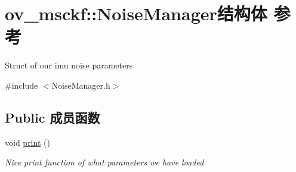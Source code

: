\hypertarget{structov__msckf_1_1NoiseManager}{}\section{ov\+\_\+msckf\+:\+:Noise\+Manager结构体 参考}
\label{structov__msckf_1_1NoiseManager}


Struct of our imu noise parameters  




{\ttfamily \#include $<$Noise\+Manager.\+h$>$}

\subsection*{Public 成员函数}
\begin{DoxyCompactItemize}
\item 
\mbox{\label{structov__msckf_1_1NoiseManager_a22f023f5dccac5c08d2785e33ec0eeee}} 
void \hyperlink{structov__msckf_1_1NoiseManager_a22f023f5dccac5c08d2785e33ec0eeee}{print} ()
\begin{DoxyCompactList}\small\item\em Nice print function of what parameters we have loaded \end{DoxyCompactList}\end{DoxyCompactItemize}
